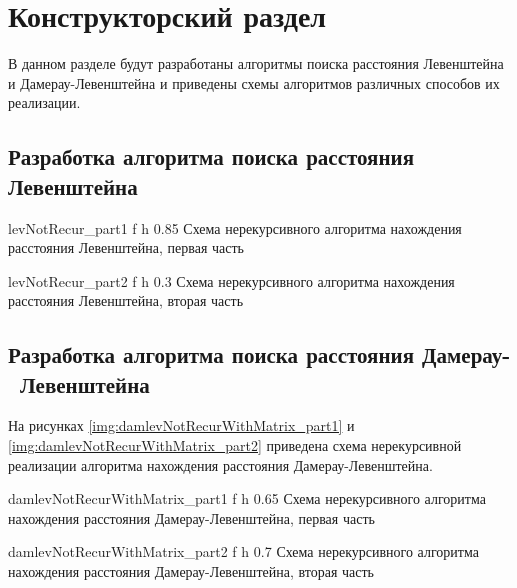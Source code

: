 \chapter{Конструкторский раздел}

В данном разделе будут разработаны алгоритмы поиска расстояния Левенштейна и Дамерау-Левенштейна и приведены схемы алгоритмов различных способов их реализации.

\section{Разработка алгоритма поиска расстояния Левенштейна}

{levNotRecur_part1} %
{f} %
{h} %
{0.85\textwidth} %
{Схема нерекурсивного алгоритма нахождения расстояния Левенштейна, первая часть} %

{levNotRecur_part2} %
{f} %
{h} %
{0.3\textwidth} %
{Схема нерекурсивного алгоритма нахождения расстояния Левенштейна, вторая часть} %

\clearpage

\section{Разработка алгоритма поиска расстояния Дамерау- Левенштейна}

На рисунках \ref{img:damlevNotRecurWithMatrix_part1} и \ref{img:damlevNotRecurWithMatrix_part2}
приведена схема нерекурсивной реализации алгоритма нахождения расстояния Дамерау-Левенштейна.

{damlevNotRecurWithMatrix_part1} %
{f} %
{h} %
{0.65\textwidth} %
{Схема нерекурсивного алгоритма нахождения расстояния Дамерау-Левенштейна, первая часть} %


{damlevNotRecurWithMatrix_part2} %
{f} %
{h} %
{0.7\textwidth} %
{Схема нерекурсивного алгоритма нахождения расстояния Дамерау-Левенштейна, вторая часть} %

